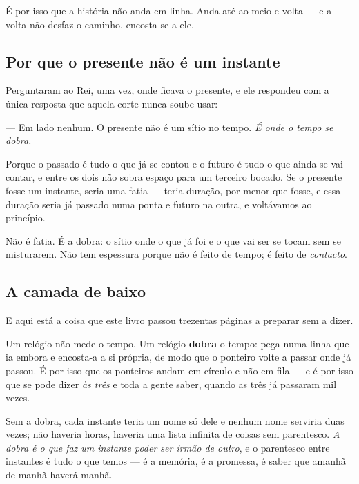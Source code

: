 \documentclass[livro.tex]{subfiles}
\begin{document}
\medskip

É por isso que a história não anda em linha. Anda até ao meio e volta --- e a volta não desfaz o
caminho, encosta-se a ele.

\subsection*{Por que o presente não é um instante}

Perguntaram ao Rei, uma vez, onde ficava o presente, e ele respondeu com a única resposta que
aquela corte nunca soube usar:

\medskip

--- Em lado nenhum. O presente não é um sítio no tempo. \emph{É onde o tempo se dobra.}

\medskip

Porque o passado é tudo o que já se contou e o futuro é tudo o que ainda se vai contar, e entre os
dois não sobra espaço para um terceiro bocado. Se o presente fosse um instante, seria uma fatia
--- teria duração, por menor que fosse, e essa duração seria já passado numa ponta e futuro na
outra, e voltávamos ao princípio.

\medskip

Não é fatia. É a dobra: o sítio onde o que já foi e o que vai ser se tocam sem se misturarem. Não
tem espessura porque não é feito de tempo; é feito de \emph{contacto}.

\subsection*{A camada de baixo}

E aqui está a coisa que este livro passou trezentas páginas a preparar sem a dizer.

\medskip

Um relógio não mede o tempo. Um relógio \textbf{dobra} o tempo: pega numa linha que ia embora e
encosta-a a si própria, de modo que o ponteiro volte a passar onde já passou. É por isso que os
ponteiros andam em círculo e não em fila --- e é por isso que se pode dizer \emph{às três} e toda
a gente saber, quando as três já passaram mil vezes.

\medskip

Sem a dobra, cada instante teria um nome só dele e nenhum nome serviria duas vezes; não haveria
horas, haveria uma lista infinita de coisas sem parentesco. \emph{A dobra é o que faz um instante
poder ser irmão de outro}, e o parentesco entre instantes é tudo o que temos --- é a memória, é a
promessa, é saber que amanhã de manhã haverá manhã.
\end{document}
